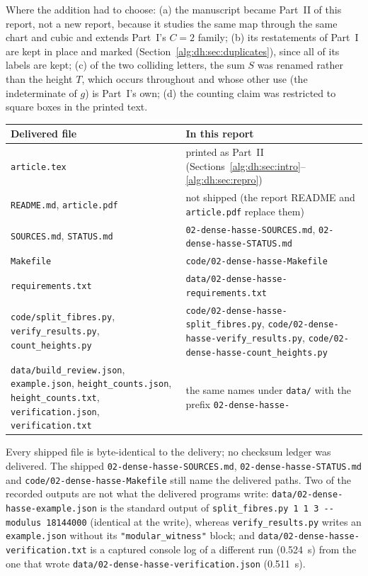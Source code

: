 \documentclass[11pt]{article}
\numberwithin{equation}{section}
\theoremstyle{plain}
\theoremstyle{plain}
\theoremstyle{plain}
\theoremstyle{definition}
\theoremstyle{definition}
\theoremstyle{definition}
\theoremstyle{remark}
\newcommand{\rpath}[1]{\nolinkurl{#1}}
\begin{document}
Where the addition had to choose: (a) the manuscript became Part~II of
this report, not a new report, because it studies the same map through the
same chart and cubic and extends Part~I's $C=2$ family; (b) its
restatements of Part~I are kept in place and marked
(Section~\ref{alg:dh:sec:duplicates}), since all of its labels are kept;
(c) of the two colliding letters, the sum $S$ was renamed rather than the
height $T$, which occurs throughout and whose other use (the indeterminate
of $g$) is Part~I's own; (d) the counting claim was restricted to square
boxes in the printed text.

\begin{center}\small
\begin{tabular}{>{\raggedright}p{}>{\raggedright\arraybackslash}p{}}
\toprule
Delivered file & In this report\\
\midrule
\texttt{article.tex} & printed as Part~II
(Sections~\ref{alg:dh:sec:intro}--\ref{alg:dh:sec:repro})\\
\texttt{README.md}, \texttt{article.pdf} & not shipped (the report README
and \rpath{article.pdf} replace them)\\
\texttt{SOURCES.md}, \texttt{STATUS.md} &
\rpath{02-dense-hasse-SOURCES.md}, \rpath{02-dense-hasse-STATUS.md}\\
\texttt{Makefile} & \rpath{code/02-dense-hasse-Makefile}\\
\texttt{requirements.txt} & \rpath{data/02-dense-hasse-requirements.txt}\\
\texttt{code/split\_fibres.py}, \texttt{verify\_results.py},
\texttt{count\_heights.py} & \rpath{code/02-dense-hasse-split_fibres.py},
\rpath{code/02-dense-hasse-verify_results.py},
\rpath{code/02-dense-hasse-count_heights.py}\\
\texttt{data/build\_review.json}, \texttt{example.json},
\texttt{height\_counts.json}, \texttt{height\_counts.txt},
\texttt{verification.json}, \texttt{verification.txt} &
the same names under \rpath{data/} with the prefix
\texttt{02-dense-hasse-}\\
\bottomrule
\end{tabular}
\end{center}
Every shipped file is byte-identical to the delivery; no checksum ledger
was delivered. The shipped \rpath{02-dense-hasse-SOURCES.md},
\rpath{02-dense-hasse-STATUS.md} and \rpath{code/02-dense-hasse-Makefile}
still name the delivered paths. Two of the recorded outputs are not what
the delivered programs write: \rpath{data/02-dense-hasse-example.json}
is the standard output of \texttt{split\_fibres.py 1 1 3 -{}-modulus
18144000} (identical at the write), whereas \texttt{verify\_results.py}
writes an \texttt{example.json} without its \texttt{"modular\_witness"}
block; and \rpath{data/02-dense-hasse-verification.txt} is a captured
console log of a different run (0.524~s) from the one that wrote
\rpath{data/02-dense-hasse-verification.json} (0.511~s).
\end{document}
